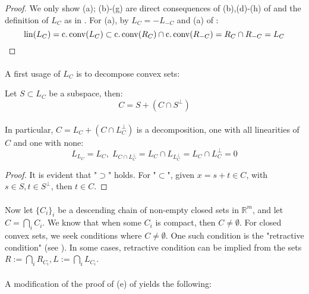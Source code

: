 \begin{proof}
	We only show (a); (b)-(g) are direct consequences of (b),(d)-(h) of  and the definition of $L_C$ as in . For (a), by $L_C=-L_{-C}$ and (a) of :
	\[
		\operatorname{lin}(L_C)=\operatorname{c.conv}(L_C)\subset\operatorname{c.conv}(R_C)\cap \operatorname{c.conv}(R_{-C})=R_C\cap R_{-C}=L_C\qedhere{}
	\]
\end{proof}

\paragraph{}A first usage of $L_C$ is to decompose convex sets:

\begin{prop}
	\label{prop:013-decomposition}
	Let $S\subset L_C$ be a subspace, then:
	\[C=S+(C\cap S^{\perp})\]
\end{prop}

\paragraph{}In particular, $C=L_C+(C\cap L_C^\perp)$ is a decomposition, one with all linearities of $C$ and one with none:
\[
	L_{L_C}=L_C,\; L_{C\cap L_C^\perp}=L_C\cap L_{L_C^\perp}=L_C\cap L_C^\perp=0
\]

\begin{proof}
	It is evident that "$\supset$" holds. For "$\subset$", given $x=s+t\in C$, with $s\in S,t\in S^\perp$, then $t\in C$.
\end{proof}

\paragraph{}Now let $\{C_i\}_i$ be a descending chain of non-empty closed sets in $\mathbb{R}^m$, and let $C=\bigcap_iC_i$. We know that when some $C_i$ is compact, then $C\neq\emptyset$. For closed convex sets, we seek conditions where $C\neq\emptyset$. One such condition is the "retractive condition" (see ). In some cases, retractive condition can be implied from the sets $R:=\bigcap_i R_{C_i},L:=\bigcap_i L_{C_i}$.

\paragraph{}A modification of the proof of (e) of  yields the following:

